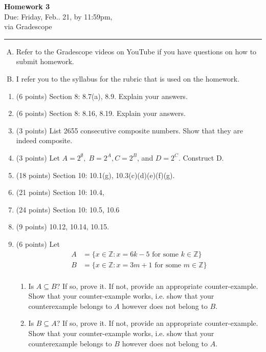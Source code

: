 \documentclass[12pt]{article}
\newif\ifshow
\begin{document}
\begin{center}
\ifshow
  \textbf{\Large Homework 0 Solution}\\
\else
  \textbf{\Large Homework 3}\\
\fi
Due: Friday, Feb.. 21, by 11:59pm,\\via Gradescope\\
\end{center}

\hrule

\vspace{0.2cm}
\noindent
\begin{enumerate}[A.]
\item Refer to the Gradescope videos on YouTube if you have questions on how to submit homework.  
\item I refer you to the syllabus for the rubric that is used on the homework.  
\end{enumerate}




\begin{enumerate}
    \item (6 points) Section 8:  8.7(a), 8.9.  Explain your answers.  
    \item (6 points) Section 8:   8.16, 8.19.  Explain your answers.  
    \item (3 points) List 2655 consecutive composite numbers.  Show that they are indeed composite.  
    \item (3 points) Let $A = 2^{\emptyset}, \; B = 2^{A}, C = 2^{B}$, and $D = 2^{C}$.  Construct D.      
    \item (18 points) Section 10:  10.1(g), 10.3(c)(d)(e)(f)(g).  
    \item (21 points) Section 10: 10.4, 
    \item (24 points) Section 10: 10.5, 10.6
    \item (9 points) 10.12, 10.14, 10.15.  
    \item (6 points)  Let 
    \[    
    \begin{aligned}
    A &= \{ x \in \mathbb{Z}: x = 6k -5 \mbox{ for some } k \in \mathbb{Z} \} \\
    B &= \{ x \in \mathbb{Z}: x = 3m + 1 \mbox{ for some } m \in \mathbb{Z} \} \\
    \end{aligned}
    \]
    \begin{enumerate}
        \item Is $A \subseteq B$?  If so, prove it.  If not, provide an appropriate counter-example.  Show that your counter-example works, i.e. show that your counterexample belongs to $A$ however does not belong to $B$.  
        \item  Is $B \subseteq A$?  If so, prove it.  If not, provide an appropriate counter-example.  Show that your counter-example works, i.e. show that your counterexample belongs to $B$ however does not belong to $A$.  
    \end{enumerate}
    \end{enumerate}
\end{document}
